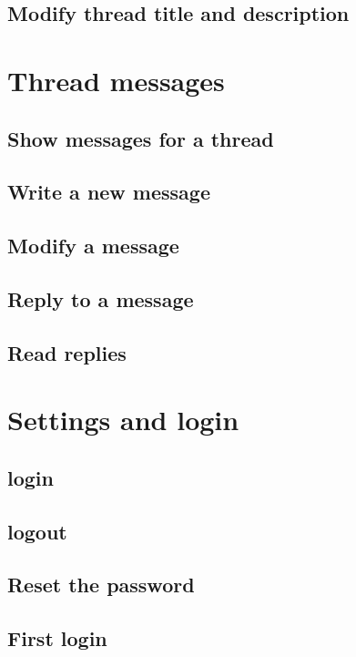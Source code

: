 \documentclass[12pt,a4paper,oneside]{report}
\begin{document}
\subsection{Modify thread title and description}

\section{Thread messages}

\subsection{Show messages for a thread}

\subsection{Write a new message}

\subsection{Modify a message}

\subsection{Reply to a message}

\subsection{Read replies}

\section{Settings and login}

\subsection{login}

\subsection{logout}

\subsection{Reset the password}

\subsection{First login}
\end{document}
